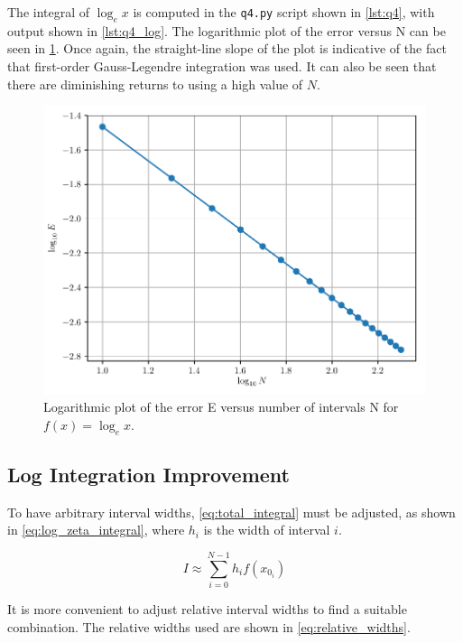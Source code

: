 \documentclass[a4paper,titlepage]{article}
\newcommand{\code}[1]{\texttt{#1}}
\begin{document}
	The integral of $\log_e x$ is computed in the \code{q4.py} script shown in \cref{lst:q4}, with output shown in \cref{lst:q4_log}. The logarithmic plot of the error versus N can be seen in \cref{fig:q4b}. Once again, the straight-line slope of the plot is indicative of the fact that first-order Gauss-Legendre integration was used. It can also be seen that there are diminishing returns to using a high value of $N$.
	
	\begin{figure}[!htb]
		\centering
		\includegraphics[width=\columnwidth]{plots/q4b.pdf}
		\caption
		{Logarithmic plot of the error E versus number of intervals N for $f(x) = \log_e x$.}
		\label{fig:q4b}
	\end{figure}
	
	\subsection{Log Integration Improvement}
	
	To have arbitrary interval widths, \cref{eq:total_integral} must be adjusted, as shown in \cref{eq:log_zeta_integral}, where $h_i$ is the width of interval $i$.
	
	\begin{equation} \label{eq:log_zeta_integral}
		I \approx \sum_{i=0}^{N-1} h_i f(x_{0_i}) 
	\end{equation}
	
	It is more convenient to adjust relative interval widths to find a suitable combination. The relative widths used are shown in \cref{eq:relative_widths}.
	
\end{document}
